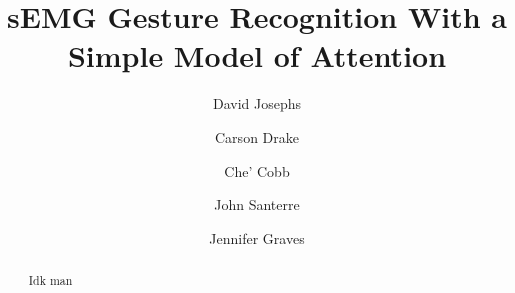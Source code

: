 \documentclass{llncs}
\title{sEMG Gesture Recognition With a Simple Model of Attention}
\author{%
David Josephs\inst{1} \and
Carson Drake\inst{1} \and
Che' Cobb\inst{1} \and
John Santerre\inst{1} \and
Jennifer Graves %
}
\institute{%
Master of Science in Data Science, Southern Methodist University,
Dallas TX 75275 USA 
\email{\{josephsd, drakec, cobbc\}@smu.edu} %
}
\begin{document}
\maketitle              %

\setcounter{footnote}{0}
\begin{abstract} 
	Idk man
%
%
%
%




\end{abstract}

\end{document}
